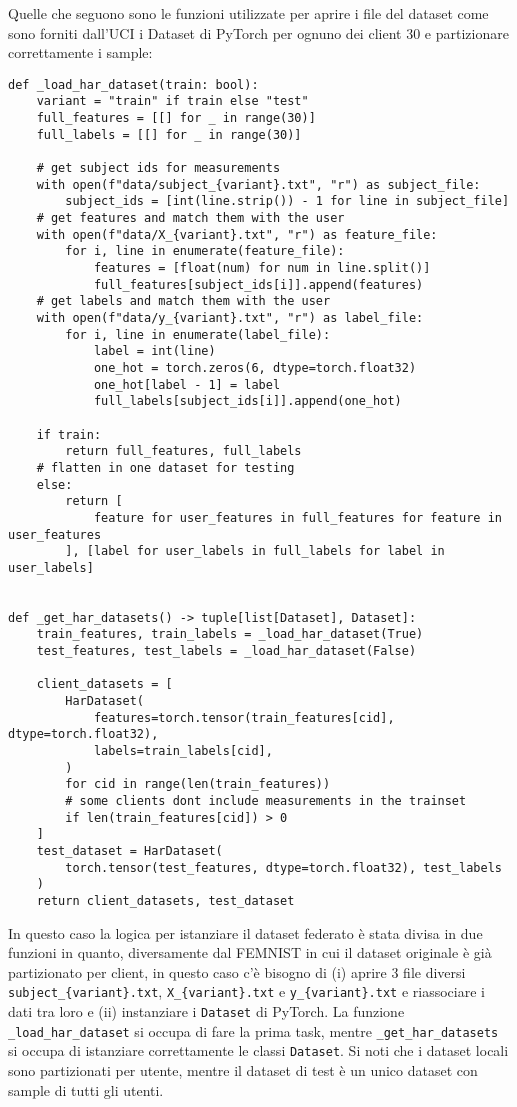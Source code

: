 Quelle che seguono sono le funzioni utilizzate per aprire i file del 
dataset come sono forniti dall'UCI i Dataset di PyTorch per 
ognuno dei client 30 e partizionare correttamente i sample:
\clearpage
\begin{lstlisting}
def _load_har_dataset(train: bool):
    variant = "train" if train else "test"
    full_features = [[] for _ in range(30)]
    full_labels = [[] for _ in range(30)]

    # get subject ids for measurements
    with open(f"data/subject_{variant}.txt", "r") as subject_file:
        subject_ids = [int(line.strip()) - 1 for line in subject_file]
    # get features and match them with the user
    with open(f"data/X_{variant}.txt", "r") as feature_file:
        for i, line in enumerate(feature_file):
            features = [float(num) for num in line.split()]
            full_features[subject_ids[i]].append(features)
    # get labels and match them with the user
    with open(f"data/y_{variant}.txt", "r") as label_file:
        for i, line in enumerate(label_file):
            label = int(line)
            one_hot = torch.zeros(6, dtype=torch.float32)
            one_hot[label - 1] = label
            full_labels[subject_ids[i]].append(one_hot)

    if train:
        return full_features, full_labels
    # flatten in one dataset for testing
    else:
        return [
            feature for user_features in full_features for feature in user_features
        ], [label for user_labels in full_labels for label in user_labels]


def _get_har_datasets() -> tuple[list[Dataset], Dataset]:
    train_features, train_labels = _load_har_dataset(True)
    test_features, test_labels = _load_har_dataset(False)

    client_datasets = [
        HarDataset(
            features=torch.tensor(train_features[cid], dtype=torch.float32),
            labels=train_labels[cid],
        )
        for cid in range(len(train_features))
        # some clients dont include measurements in the trainset
        if len(train_features[cid]) > 0
    ]
    test_dataset = HarDataset(
        torch.tensor(test_features, dtype=torch.float32), test_labels
    )
    return client_datasets, test_dataset
\end{lstlisting}

In questo caso la logica per istanziare il dataset federato è stata 
divisa in due funzioni in quanto, diversamente dal FEMNIST in cui il 
dataset originale è già partizionato per client, in questo caso c'è 
bisogno di (i) aprire 3 file diversi \texttt{subject\_\{variant\}.txt}, 
\texttt{X\_\{variant\}.txt} e \texttt{y\_\{variant\}.txt} e riassociare 
i dati tra loro e (ii) instanziare i \texttt{Dataset} di PyTorch.
La funzione \texttt{\_load\_har\_dataset} si occupa di fare la prima task,
mentre \texttt{\_get\_har\_datasets} si occupa di istanziare correttamente le classi 
\texttt{Dataset}. Si noti che i dataset locali sono partizionati per 
utente, mentre il dataset di test è un unico dataset con sample di 
tutti gli utenti.


